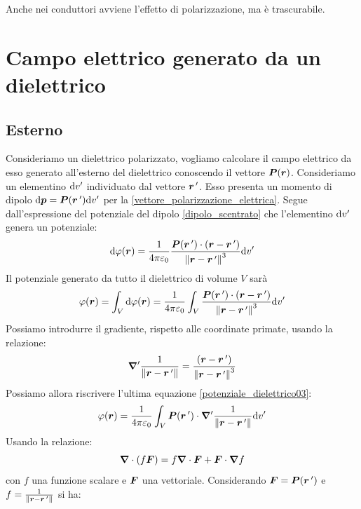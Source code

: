 Anche nei conduttori avviene l'effetto di polarizzazione, ma è trascurabile.

\section{Campo elettrico generato da un dielettrico}
\label{section:Campo_elettrico_generato_da_un_dielettrico}
\subsection{Esterno}
Consideriamo un dielettrico polarizzato, vogliamo calcolare il campo elettrico da esso generato all'esterno del dielettrico conoscendo il vettore $\boldsymbol{P}(\boldsymbol{r})$. Consideriamo un elementino $\mathrm{d} v'$ individuato dal vettore $\boldsymbol{r}\,'$. Esso presenta un momento di dipolo $\mathrm{d}\boldsymbol{p}=\boldsymbol{P}(\boldsymbol{r}\,')\mathrm{d} v'$ per la \eqref{vettore_polarizzazione_elettrica}. Segue dall'espressione del potenziale del dipolo \eqref{dipolo_scentrato} che l'elementino $\mathrm{d} v'$ genera un potenziale:
\begin{equation}
  \mathrm{d}\varphi(\boldsymbol{r})=\frac{1}{4\pi\varepsilon_0}\frac{\boldsymbol{P}(\boldsymbol{r}\,')\cdot\left(\boldsymbol{r}-\boldsymbol{r}\,'\right)}{\left\lVert\boldsymbol{r}-\boldsymbol{r}\,'\right\rVert^3}\mathrm{d} v'
\end{equation}
Il potenziale generato da tutto il dielettrico di volume $V$ sarà
\begin{equation}
  \varphi(\boldsymbol{r})=\int_V\mathrm{d}\varphi(\boldsymbol{r})=\frac{1}{4\pi\varepsilon_0}\int_V\frac{\boldsymbol{P}(\boldsymbol{r}\,')\cdot\left(\boldsymbol{r}-\boldsymbol{r}\,'\right)}{\left\lVert\boldsymbol{r}-\boldsymbol{r}\,'\right\rVert^3}\mathrm{d} v'
  \label{potenziale_dielettrico03}
\end{equation}
Possiamo introdurre il gradiente, rispetto alle coordinate primate, usando la relazione:
\begin{equation}
  \boldsymbol{\nabla}'\frac{1}{\left\lVert\boldsymbol{r}-\boldsymbol{r}\,'\right\rVert}=\frac{\left(\boldsymbol{r}-\boldsymbol{r}\,'\right)}{\left\lVert\boldsymbol{r}-\boldsymbol{r}\,'\right\rVert^3}
\end{equation}
Possiamo allora riscrivere l'ultima equazione \eqref{potenziale_dielettrico03}:
\begin{equation}
  \varphi(\boldsymbol{r})=\frac{1}{4\pi\varepsilon_0}\int_V\boldsymbol{P}(\boldsymbol{r}\,')\cdot\boldsymbol{\nabla}'\frac{1}{\left\lVert\boldsymbol{r}-\boldsymbol{r}\,'\right\rVert}\mathrm{d} v'
  \label{potenziale_dielettrico04}
\end{equation}
Usando la relazione:
\begin{equation}
  \boldsymbol{\nabla}\cdot(f\boldsymbol{F})=f\boldsymbol{\nabla}\cdot\boldsymbol{F}+\boldsymbol{F}\cdot\boldsymbol{\nabla} f
\end{equation}
con $f$ una funzione scalare e $\boldsymbol{F}$ una vettoriale. Considerando $\boldsymbol{F}=\boldsymbol{P}(\boldsymbol{r}\,')$ e $f=\frac{1}{\left\lVert\boldsymbol{r}-\boldsymbol{r}\,'\right\rVert}$ si ha:
